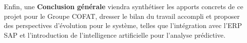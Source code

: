 Enfin, une \textbf{Conclusion générale} viendra synthétiser les apports concrets de ce projet pour le Groupe COFAT, dresser le bilan du travail accompli et proposer des perspectives d'évolution pour le système, telles que l'intégration avec l'ERP SAP et l'introduction de l'intelligence artificielle pour l'analyse prédictive.

